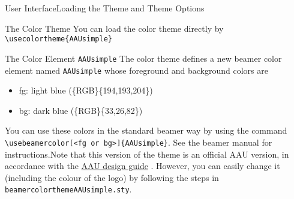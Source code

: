 \documentclass[10pt]{beamer}
\newcommand{\chref}[2]{%
  \href{#1}{{\usebeamercolor[bg]{AAUsimple}#2}}%
}
\begin{document}
\begin{frame}{User Interface}{Loading the Theme and Theme Options}
  \begin{block}{The Color Theme}
    You can load the color theme directly by
    {\tt \textbackslash usecolortheme\{AAUsimple\}}
  \end{block}
  \pause
  \begin{block}{The Color Element {\tt AAUsimple}}
    The color theme defines a new beamer color element named {\tt AAUsimple} whose foreground and background colors are
    \begin{itemize}
      \item fg: {light blue (\{RGB\}\{194,193,204\})}
      \item bg: {dark blue (\{RGB\}\{33,26,82\})}
    \end{itemize}
    You can use these colors in the standard beamer way by using the command
    {\tt \textbackslash usebeamercolor[<fg or bg>]\{AAUsimple\}}. See the beamer manual for instructions.\pause Note that this version of the theme is an official AAU version, in accordance with the \chref{http://aau.designguiden.dk/}{AAU design guide}. However, you can easily change it (including the colour of the logo) by following the steps in {\tt beamercolorthemeAAUsimple.sty}.
  \end{block}
\end{frame}
\end{document}
